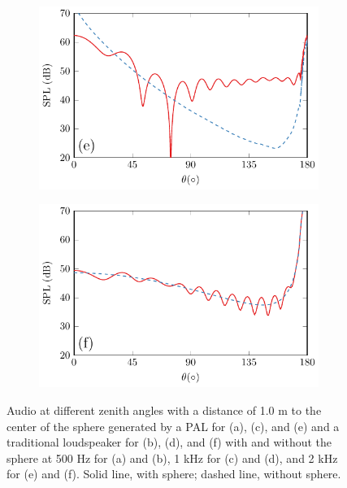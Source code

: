 \begin{figure}[!htb]
\begin{subfigure}{0.49\textwidth}
        \includegraphics[width = \textwidth]{fig/PalSphereNoSphere_VaryAngle_211211A_Compare_r100cm_2000Hz_211211D.pdf}
    \end{subfigure}
    \begin{subfigure}{0.49\textwidth}
        \centering
        \includegraphics[width = \textwidth]{fig/CircPistonSphereNoSphere_210718D_2000Hz_Compare_211013As_v2.pdf}
    \end{subfigure}
    \caption{ Audio  at different zenith angles with a distance of 1.0 m to the center of the sphere generated by a PAL for (a), (c), and (e) and a traditional loudspeaker for (b), (d), and (f) with and without the sphere at 500 Hz for (a) and (b), 1 kHz for (c) and (d), and 2 kHz for (e) and (f).
    Solid line, with sphere; dashed line, without sphere.}
    \label{fig:scat_sim_with_without_sphere}
\end{figure}


